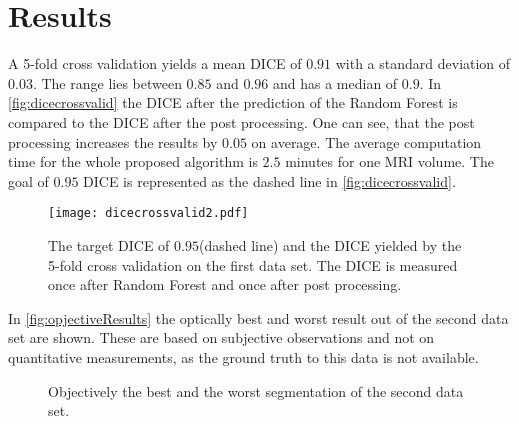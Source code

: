 \section{Results}
A 5-fold cross validation yields a mean DICE of $0.91$ with a standard deviation of $0.03$. The range lies between $0.85$ and $0.96$ and has a median of $0.9$. In \autoref{fig:dicecrossvalid} the DICE after the prediction of the Random Forest is compared to the DICE after the post processing. One can see, that the post processing increases the results by $0.05$ on average. The average computation time for the whole proposed algorithm is $2.5$ minutes for one MRI volume. The goal of $0.95$ DICE is represented as the dashed line in \autoref{fig:dicecrossvalid}.
\begin{figure}[h]
\centering
\texttt{[image: dicecrossvalid2.pdf]}
\caption{The target DICE of $0.95$(dashed line) and the DICE yielded by the 5-fold cross validation on the first data set. The DICE is measured once after Random Forest and once after post processing.}
\label{fig:dicecrossvalid}
\end{figure}

In \autoref{fig:opjectiveResults} the optically best and worst result out of the second data set are shown. These are based on subjective observations and not on quantitative measurements, as the ground truth to this data is not available.
\begin{figure*}[!t]
	\centering
	\hfil
	
	\caption{Objectively the best and the worst segmentation of the second data set.}
	\label{fig:opjectiveResults}
\end{figure*}